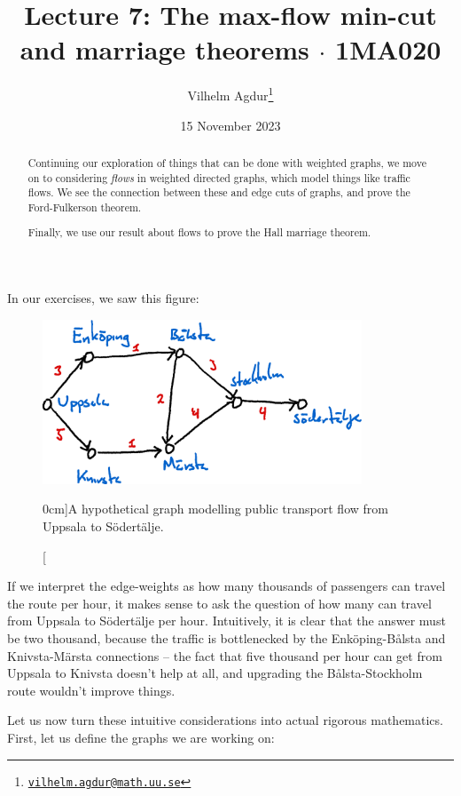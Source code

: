 \documentclass[nobib]{tufte-handout}
\title{Lecture 7: The max-flow min-cut and marriage theorems $\cdot$ 1MA020}
\author[Vilhelm Agdur]{Vilhelm Agdur\thanks{\href{mailto:vilhelm.agdur@math.uu.se}{\nolinkurl{vilhelm.agdur@math.uu.se}}}}
\date{15 November 2023}
\begin{document}
\maketitle%

\begin{abstract}
\noindent
Continuing our exploration of things that can be done with weighted graphs, we move on to considering \emph{flows} in weighted directed graphs, which model things like traffic flows. We see the connection between these and edge cuts of graphs, and prove the Ford-Fulkerson theorem.

Finally, we use our result about flows to prove the Hall marriage theorem.
\end{abstract}

In our exercises, we saw this figure:
\begin{figure}
    \centering
    \includegraphics[width=0.85\textwidth]{graphics/L5_exc_MSTs_etc/train_network_flow.png}
    \caption[][0cm]{A hypothetical graph modelling public transport flow from Uppsala to Södertälje.}
    \label{fig:uppsala_stockholm_traffic}
  \end{figure}

  If we interpret the edge-weights as how many thousands of passengers can travel the route per hour, it makes sense to ask the question of how many can travel from Uppsala to Södertälje per hour. Intuitively, it is clear that the answer must be two thousand, because the traffic is bottlenecked by the Enköping-Bålsta and Knivsta-Märsta connections -- the fact that five thousand per hour can get from Uppsala to Knivsta doesn't help at all, and upgrading the Bålsta-Stockholm route wouldn't improve things.

  Let us now turn these intuitive considerations into actual rigorous mathematics. First, let us define the graphs we are working on:
\end{document}
